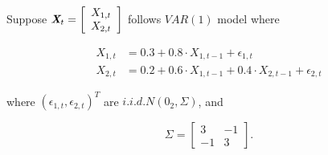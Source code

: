 Suppose $\textbf{\em X}_t=\left[\begin{array}{c} X_{1,t} \\ X_{2,t} \end{array}\right]$ follows $VAR(1)$ model where

\begin{equation}
\nonumber
\begin{aligned}
X_{1,t} & = 0.3 + 0.8 \cdot X_{1,t-1} + \epsilon_{1,t} \\
X_{2,t} & = 0.2 + 0.6 \cdot X_{1,t-1} + 0.4 \cdot X_{2,t-1} + \epsilon_{2,t}
\end{aligned}
\end{equation}


where $(\epsilon_{1,t}, \epsilon_{2,t})^T$ are $i.i.d.N(0_2,\Sigma)$, and 

\begin{equation}
\nonumber
\Sigma = \left[\begin{array}{cc} 3 & -1 \\ -1 & 3\end{array}\right].
\end{equation}




